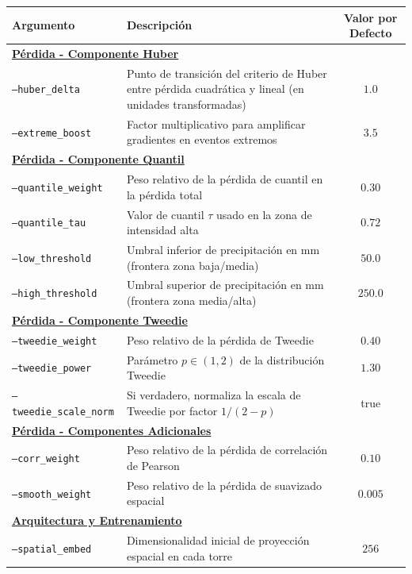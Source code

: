 \begin{table}[h!]
\centering
\begin{tabularx}{\textwidth}{|l|p{8cm}|c|}
\hline
\textbf{Argumento} & \textbf{Descripción} & \textbf{Valor por Defecto} \\
\hline
\multicolumn{3}{|l|}{\textbf{\underline{Pérdida - Componente Huber}}} \\
\hline
\texttt{--huber\_delta} & Punto de transición del criterio de Huber entre pérdida cuadrática y lineal (en unidades transformadas) & $1.0$ \\
\texttt{--extreme\_boost} & Factor multiplicativo para amplificar gradientes en eventos extremos & $3.5$ \\
\hline
\multicolumn{3}{|l|}{\textbf{\underline{Pérdida - Componente Quantil}}} \\
\hline
\texttt{--quantile\_weight} & Peso relativo de la pérdida de cuantil en la pérdida total & $0.30$ \\
\texttt{--quantile\_tau} & Valor de cuantil $\tau$ usado en la zona de intensidad alta & $0.72$ \\
\texttt{--low\_threshold} & Umbral inferior de precipitación en mm (frontera zona baja/media) & $50.0$ \\
\texttt{--high\_threshold} & Umbral superior de precipitación en mm (frontera zona media/alta) & $250.0$ \\
\hline
\multicolumn{3}{|l|}{\textbf{\underline{Pérdida - Componente Tweedie}}} \\
\hline
\texttt{--tweedie\_weight} & Peso relativo de la pérdida de Tweedie & $0.40$ \\
\texttt{--tweedie\_power} & Parámetro $p \in (1, 2)$ de la distribución Tweedie & $1.30$ \\
\texttt{--tweedie\_scale\_norm} & Si verdadero, normaliza la escala de Tweedie por factor $1/(2-p)$ & true \\
\hline
\multicolumn{3}{|l|}{\textbf{\underline{Pérdida - Componentes Adicionales}}} \\
\hline
\texttt{--corr\_weight} & Peso relativo de la pérdida de correlación de Pearson & $0.10$ \\
\texttt{--smooth\_weight} & Peso relativo de la pérdida de suavizado espacial & $0.005$ \\
\hline
\multicolumn{3}{|l|}{\textbf{\underline{Arquitectura y Entrenamiento}}} \\
\hline
\texttt{--spatial\_embed} & Dimensionalidad inicial de proyección espacial en cada torre & $256$ \\

\end{tabularx}
\end{table}
